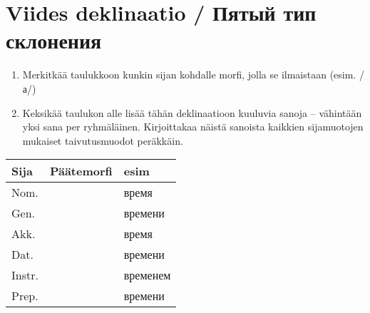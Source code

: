 \documentclass[paper=a4, fontsize=11pt]{scrartcl}
\providecommand{\tightlist}{%
  \setlength{\itemsep}{0pt}\setlength{\parskip}{0pt}}
\begin{document}
\section{Viides deklinaatio / Пятый тип
склонения}\label{viides-deklinaatio-ux43fux44fux442ux44bux439-ux442ux438ux43f-ux441ux43aux43bux43eux43dux435ux43dux438ux44f}

\begin{enumerate}
\def\labelenumi{\arabic{enumi}.}
\tightlist
\item
  Merkitkää taulukkoon kunkin sijan kohdalle morfi, jolla se ilmaistaan
  (esim. /а/)
\item
  Keksikää taulukon alle lisää tähän deklinaatioon kuuluvia sanoja --
  vähintään yksi sana per ryhmäläinen. Kirjoittakaa näistä sanoista kaikkien
  sijamuotojen mukaiset taivutusmuodot peräkkäin.
\end{enumerate}

{
\begin{longtable}[c]{@{}lll@{}}
\toprule
Sija & Päätemorfi & esim\tabularnewline
\midrule
\endhead
Nom. & & время\tabularnewline
Gen. & & времени\tabularnewline
Akk. & & время\tabularnewline
Dat. & & времени\tabularnewline
Instr. & & временем\tabularnewline
Prep. & & времени\tabularnewline
\bottomrule
\end{longtable}
}

\begin{center}

\vspace{1.1cm} 

\underline{\hspace{12cm}} \\
\vspace{0.5cm}
\underline{\hspace{12cm}} \\
\vspace{0.5cm}
\underline{\hspace{12cm}} \\
\vspace{0.5cm}
\underline{\hspace{12cm}} \\
\vspace{0.5cm}
\underline{\hspace{12cm}} \\
\vspace{0.5cm}
\underline{\hspace{12cm}} \\
\vspace{0.5cm}
\underline{\hspace{12cm}} \\
\vspace{0.5cm}
\underline{\hspace{12cm}} \\
\vspace{0.5cm}
\underline{\hspace{12cm}} \\

\end{center}
\end{document}
